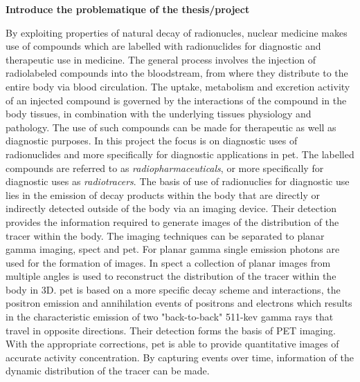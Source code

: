 \textbf{Introduce the problematique of the thesis/project}

By exploiting properties of natural decay of radionucles, nuclear medicine makes use of compounds which are labelled with radionuclides for diagnostic and therapeutic use in medicine. The general process involves the injection of radiolabeled compounds into the bloodstream, from where they distribute to the entire body via blood circulation. The uptake, metabolism and excretion activity of an injected compound is governed by the interactions of the compound in the body tissues, in combination with the underlying tissues physiology and pathology. 
The use of such compounds can be made for therapeutic as well as diagnostic purposes. In this project the focus is on diagnostic uses of radionuclides and more specifically for diagnostic applications in \gls{pet}.
The labelled compounds are referred to as \textit{radiopharmaceuticals}, or more specifically for diagnostic uses as \textit{radiotracers}.
The basis of use of radionuclies for diagnostic use lies in the emission of decay products within the body that are directly or indirectly detected outside of the body via an imaging device. Their detection provides the information required to generate images of the distribution of the tracer within the body. The imaging techniques can be separated to planar gamma imaging, \gls{spect} and \gls{pet}. For planar gamma single emission photons are used for the formation of images. In \gls{spect} a collection of planar images from multiple angles is used to reconstruct the distribution of the tracer within the body in 3D. 
\Gls{pet} is based on a more specific decay scheme and interactions, the positron emission and annihilation events of positrons and electrons which results in the characteristic emission of two "back-to-back" 511-kev gamma rays that travel in opposite directions. Their detection forms the basis of PET imaging. 
\\
With the appropriate corrections, \gls{pet} is able to provide quantitative images of accurate activity concentration. By capturing events over time, information of the dynamic distribution of the tracer can be made. 

